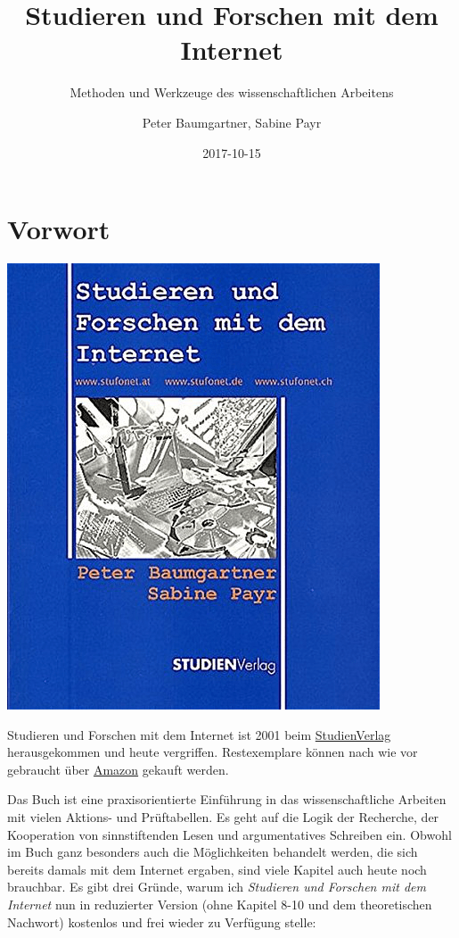\documentclass[]{book}
\title{Studieren und Forschen mit dem Internet}
\subtitle{Methoden und Werkzeuge des wissenschaftlichen Arbeitens}
\author{Peter Baumgartner, Sabine Payr}
\date{2017-10-15}
\theoremstyle{definition}
\theoremstyle{definition}
\theoremstyle{definition}
\theoremstyle{remark}
\begin{document}
\maketitle

{
\hypersetup{linkcolor=black}
\setcounter{tocdepth}{2}
\tableofcontents
}
\chapter*{Vorwort}\label{vorwort}

\begin{center}\href{http://www.studienverlag.at/page.cfm?vpath=buecher/buchdetail&titnr=1319}{\includegraphics{images/cover-stufonet-min} }\end{center}

Studieren und Forschen mit dem Internet ist 2001 beim
\href{http://www.studienverlag.at/page.cfm?vpath=buecher/buchdetail\&bookclass=\&titnr=1319}{StudienVerlag}
herausgekommen und heute vergriffen. Restexemplare können nach wie vor
gebraucht über
\href{https://www.amazon.de/Studieren-Forschen-mit-dem-Internet/dp/3706513196/ref=sr_1_1?ie=UTF8\&qid=1508089811\&sr=8-1\&keywords=studieren+und+forschen+mit+dem+internet}{Amazon}
gekauft werden.

Das Buch \citep{Baumgartner_Payr_2001} ist eine praxisorientierte
Einführung in das wissenschaftliche Arbeiten mit vielen Aktions- und
Prüftabellen. Es geht auf die Logik der Recherche, der Kooperation von
sinnstiftenden Lesen und argumentatives Schreiben ein. Obwohl im Buch
ganz besonders auch die Möglichkeiten behandelt werden, die sich bereits
damals mit dem Internet ergaben, sind viele Kapitel auch heute noch
brauchbar. Es gibt drei Gründe, warum ich \emph{Studieren und Forschen
mit dem Internet} nun in reduzierter Version (ohne Kapitel 8-10 und dem
theoretischen Nachwort) kostenlos und frei wieder zu Verfügung stelle:
\end{document}
